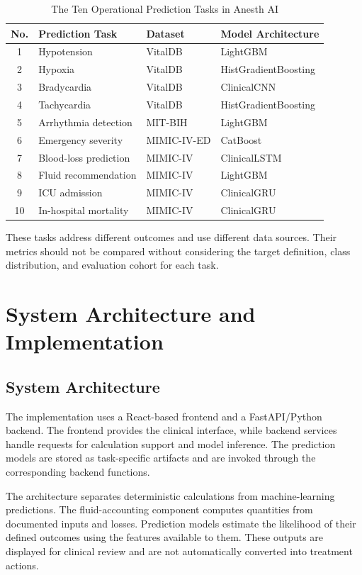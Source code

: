 \documentclass[conference]{IEEEtran}
\begin{document}
\begin{table}[htbp]
\centering
\caption{The Ten Operational Prediction Tasks in Anesth AI}
\label{tab:ten_tasks}
\begin{tabularx}{\columnwidth}{clll}
\toprule
\textbf{No.} & \textbf{Prediction Task} & \textbf{Dataset} & \textbf{Model Architecture} \\
\midrule
1 & Hypotension & VitalDB & LightGBM \\
2 & Hypoxia & VitalDB & HistGradientBoosting \\
3 & Bradycardia & VitalDB & ClinicalCNN \\
4 & Tachycardia & VitalDB & HistGradientBoosting \\
5 & Arrhythmia detection & MIT-BIH & LightGBM \\
6 & Emergency severity & MIMIC-IV-ED & CatBoost \\
7 & Blood-loss prediction & MIMIC-IV & ClinicalLSTM \\
8 & Fluid recommendation & MIMIC-IV & LightGBM \\
9 & ICU admission & MIMIC-IV & ClinicalGRU \\
10 & In-hospital mortality & MIMIC-IV & ClinicalGRU \\
\bottomrule
\end{tabularx}
\end{table}

These tasks address different outcomes and use different data sources. Their metrics should not be compared without considering the target definition, class distribution, and evaluation cohort for each task.

\section{System Architecture and Implementation}

\subsection{System Architecture}
The implementation uses a React-based frontend and a FastAPI/Python backend. The frontend provides the clinical interface, while backend services handle requests for calculation support and model inference. The prediction models are stored as task-specific artifacts and are invoked through the corresponding backend functions.

The architecture separates deterministic calculations from machine-learning predictions. The fluid-accounting component computes quantities from documented inputs and losses. Prediction models estimate the likelihood of their defined outcomes using the features available to them. These outputs are displayed for clinical review and are not automatically converted into treatment actions.
\end{document}
